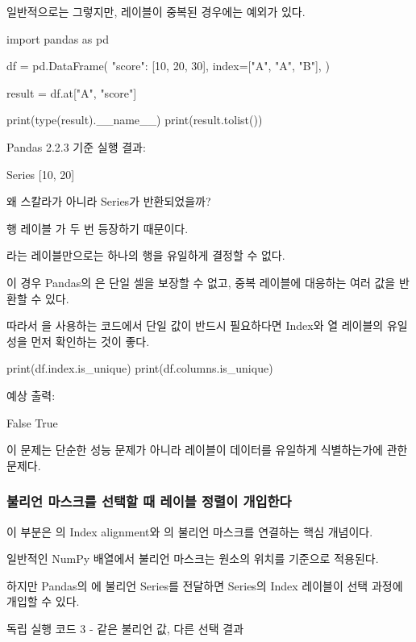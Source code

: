 일반적으로는 그렇지만, 레이블이 중복된 경우에는 예외가 있다.

\begin{dhkcode}
import pandas as pd

df = pd.DataFrame(
    {"score": [10, 20, 30]},
    index=["A", "A", "B"],
)

result = df.at["A", "score"]

print(type(result).__name__)
print(result.tolist())
\end{dhkcode}

Pandas 2.2.3 기준 실행 결과:

\begin{dhkzsh}
Series
[10, 20]
\end{dhkzsh}

왜 스칼라가 아니라 Series가 반환되었을까?

행 레이블 가 두 번 등장하기 때문이다.

라는 레이블만으로는 하나의 행을 유일하게 결정할 수 없다.

이 경우 Pandas의 은 단일 셀을 보장할 수 없고, 중복 레이블에 대응하는 여러 값을 반환할 수 있다.

따라서 을 사용하는 코드에서 단일 값이 반드시 필요하다면 Index와 열 레이블의 유일성을 먼저 확인하는 것이 좋다.

\begin{dhkcode}
print(df.index.is_unique)
print(df.columns.is_unique)
\end{dhkcode}

예상 출력:

\begin{dhkzsh}
False
True
\end{dhkzsh}

이 문제는 단순한 성능 문제가 아니라 레이블이 데이터를 유일하게 식별하는가에 관한 문제다.

\subsubsection{불리언 마스크를 선택할 때 레이블 정렬이 개입한다}

이 부분은 의 Index alignment와 의 불리언 마스크를 연결하는 핵심 개념이다.

일반적인 NumPy 배열에서 불리언 마스크는 원소의 위치를 기준으로 적용된다.

하지만 Pandas의 에 불리언 Series를 전달하면 Series의 Index 레이블이 선택 과정에 개입할 수 있다.

\begin{dhknote}
\begin{dhksmry}[centered]
독립 실행 코드 3 - 같은 불리언 값, 다른 선택 결과
\end{dhksmry}
\end{dhknote}

